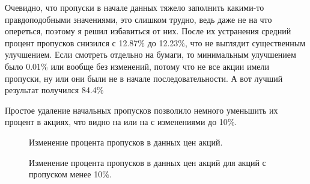 \documentclass[12pt, a4paper]{article}
\begin{document}
Очевидно, что пропуски в начале данных тяжело заполнить какими-то правдоподобными значениями, это слишком трудно, ведь даже не на что опереться, поэтому я решил избавиться от них. После их устранения средний процент пропусков снизился с 12.87\% до 12.23\%, что не выглядит существенным улучшением. Если смотреть отдельно на бумаги, то минимальным улучшением было 0.01\% или вообще без изменений, потому что не все акции имели пропуски, ну или они были не в начале последовательности. А вот лучший результат получился 84.4\%

Простое удаление начальных пропусков позволило немного уменьшить их процент в акциях, что видно на  или на  с изменениями до 10\%.
\begin{figure}[H]
\caption{Изменение процента пропусков в данных цен акций.}
\label{fig:miss_percents_change}
\end{figure}
\begin{figure}[H]
\caption{Изменение процента пропусков в данных цен акций для акций с пропуском менее 10\%.}
\label{fig:miss_percent_less_10_change}
\end{figure}
\end{document}
